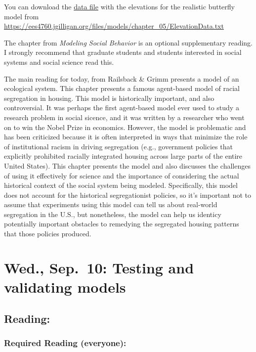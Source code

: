 \documentclass[
]{article}
\begin{document}
You can download the
\href{/files/models/chapter_05/ElevationData.txt}{data file} with the
elevations for the realistic butterfly model from
\url{https://ees4760.jgilligan.org/files/models/chapter_05/ElevationData.txt}

The chapter from \emph{Modeling Social Behavior} is an optional
supplementary reading. I strongly recommend that graduate students and
students interested in social systems and social science read this.

The main reading for today, from Railsback \& Grimm presents a model of
an ecological system. This chapter presents a famous agent-based model
of racial segregation in housing. This model is historically important,
and also controversial. It was perhaps the first agent-based model ever
used to study a research problem in social sicence, and it was written
by a researcher who went on to win the Nobel Prize in economics.
However, the model is problematic and has been criticized because it is
often interpreted in ways that minimize the role of institutional racism
in driving segregation (e.g., government policies that explicitly
prohibited racially integrated housing across large parts of the entire
United States). This chapter presents the model and also discusses the
challenges of using it effectively for science and the importance of
considering the actual historical context of the social system being
modeled. Specifically, this model does not account for the historical
segregationist policies, so it's important not to assume that
experiments using this model can tell us about real-world segregation in
the U.S., but nonetheless, the model can help us identicy potentially
important obstacles to remedying the segregated housing patterns that
those policies produced.

\section{Wed., Sep.~10: Testing and validating
models}\label{wed.-sep.-10-testing-and-validating-models}

\subsection{Reading:}\label{reading-6}

\subsubsection{Required Reading
(everyone):}\label{required-reading-everyone-5}
\end{document}
